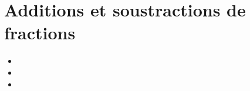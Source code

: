 \chapter{Additions et soustractions de fractions}\label{ChAddSousFrac}

\vspace{5cm}
\begin{acquis}
\begin{itemize}
\item 
\item 
\item 
\end{itemize}
\end{acquis}


\activites  


\cours


\exercicesbase
\begin{colonne*exercice}

\end{colonne*exercice}


%

\connaissances
%

%

\Recreation %
%


